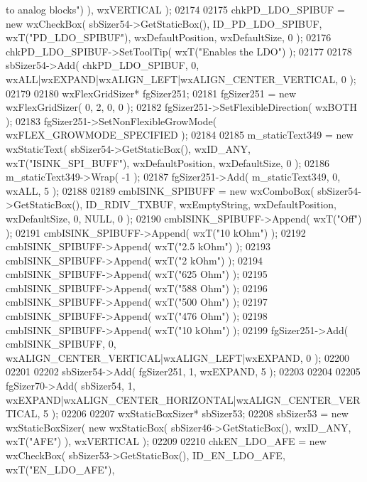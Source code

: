 \begin{DoxyCode}
{       to analog blocks"}) ), wxVERTICAL );
02174     
02175     chkPD_LDO_SPIBUF = \textcolor{keyword}{new} wxCheckBox( sbSizer54->GetStaticBox(), 
      ID_PD_LDO_SPIBUF, wxT(\textcolor{stringliteral}{"PD\_LDO\_SPIBUF"}), wxDefaultPosition, wxDefaultSize, 0 );
02176     chkPD_LDO_SPIBUF->SetToolTip( wxT(\textcolor{stringliteral}{"Enables the LDO"}) );
02177     
02178     sbSizer54->Add( chkPD_LDO_SPIBUF, 0, wxALL|wxEXPAND|wxALIGN\_LEFT|wxALIGN\_CENTER\_VERTICAL, 0 );
02179     
02180     wxFlexGridSizer* fgSizer251;
02181     fgSizer251 = \textcolor{keyword}{new} wxFlexGridSizer( 0, 2, 0, 0 );
02182     fgSizer251->SetFlexibleDirection( wxBOTH );
02183     fgSizer251->SetNonFlexibleGrowMode( wxFLEX\_GROWMODE\_SPECIFIED );
02184     
02185     m_staticText349 = \textcolor{keyword}{new} wxStaticText( sbSizer54->GetStaticBox(), wxID\_ANY, wxT(\textcolor{stringliteral}{"ISINK\_SPI\_BUFF"}), 
      wxDefaultPosition, wxDefaultSize, 0 );
02186     m_staticText349->Wrap( -1 );
02187     fgSizer251->Add( m_staticText349, 0, wxALL, 5 );
02188     
02189     cmbISINK_SPIBUFF = \textcolor{keyword}{new} wxComboBox( sbSizer54->GetStaticBox(), ID_RDIV_TXBUF, wxEmptyString, 
      wxDefaultPosition, wxDefaultSize, 0, NULL, 0 );
02190     cmbISINK_SPIBUFF->Append( wxT(\textcolor{stringliteral}{"Off"}) );
02191     cmbISINK_SPIBUFF->Append( wxT(\textcolor{stringliteral}{"10 kOhm"}) );
02192     cmbISINK_SPIBUFF->Append( wxT(\textcolor{stringliteral}{"2.5 kOhm"}) );
02193     cmbISINK_SPIBUFF->Append( wxT(\textcolor{stringliteral}{"2 kOhm"}) );
02194     cmbISINK_SPIBUFF->Append( wxT(\textcolor{stringliteral}{"625 Ohm"}) );
02195     cmbISINK_SPIBUFF->Append( wxT(\textcolor{stringliteral}{"588 Ohm"}) );
02196     cmbISINK_SPIBUFF->Append( wxT(\textcolor{stringliteral}{"500 Ohm"}) );
02197     cmbISINK_SPIBUFF->Append( wxT(\textcolor{stringliteral}{"476 Ohm"}) );
02198     cmbISINK_SPIBUFF->Append( wxT(\textcolor{stringliteral}{"10 kOhm"}) );
02199     fgSizer251->Add( cmbISINK_SPIBUFF, 0, wxALIGN\_CENTER\_VERTICAL|wxALIGN\_LEFT|wxEXPAND, 0 );
02200     
02201     
02202     sbSizer54->Add( fgSizer251, 1, wxEXPAND, 5 );
02203     
02204     
02205     fgSizer70->Add( sbSizer54, 1, wxEXPAND|wxALIGN\_CENTER\_HORIZONTAL|wxALIGN\_CENTER\_VERTICAL, 5 );
02206     
02207     wxStaticBoxSizer* sbSizer53;
02208     sbSizer53 = \textcolor{keyword}{new} wxStaticBoxSizer( \textcolor{keyword}{new} wxStaticBox( sbSizer46->GetStaticBox(), wxID\_ANY, wxT(\textcolor{stringliteral}{"AFE"}) ), 
      wxVERTICAL );
02209     
02210     chkEN_LDO_AFE = \textcolor{keyword}{new} wxCheckBox( sbSizer53->GetStaticBox(), ID_EN_LDO_AFE, wxT(\textcolor{stringliteral}{"EN\_LDO\_AFE"}), 

\end{DoxyCode}
